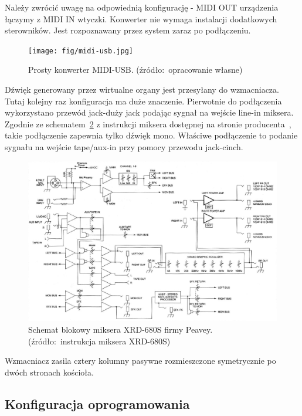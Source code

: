 \documentclass[11pt]{report}
\begin{document}
    Należy zwrócić uwagę na odpowiednią konfigurację - MIDI OUT urządzenia łączymy z MIDI IN wtyczki.
    Konwerter nie wymaga instalacji dodatkowych sterowników.
    Jest rozpoznawany przez system zaraz po podłączeniu.

    \begin{figure}[!ht]
        \centering
        \texttt{[image: fig/midi-usb.jpg]}
        \caption{Prosty konwerter MIDI-USB. (źródło:~opracowanie własne)}
        \label{fig:midiusb}
    \end{figure}

    Dźwięk generowany przez wirtualne organy jest przesyłany do wzmacniacza.
    Tutaj kolejny raz konfiguracja ma duże znaczenie.
    Pierwotnie do podłączenia wykorzystano przewód jack-duży jack podając sygnał na wejście line-in miksera.
    Zgodnie ze schematem~\ref{fig:mikser-schemat} z instrukcji miksera dostępnej na stronie producenta~\cite{peavey}, takie podłączenie zapewnia tylko dźwięk mono.
    Właściwe podłączenie to podanie sygnału na wejście tape/aux-in przy pomocy przewodu jack-cinch.

    \begin{figure}[!ht]
        \centering
        \includegraphics[width=\linewidth]{fig/peavey.png}
        \caption{Schemat blokowy miksera XRD-680S firmy Peavey. (źródło:~instrukcja miksera XRD-680S)}
        \label{fig:mikser-schemat}
    \end{figure}


    Wzmacniacz zasila cztery kolumny pasywne rozmieszczone symetrycznie po dwóch stronach kościoła.

    \subsection{Konfiguracja oprogramowania}
\end{document}
